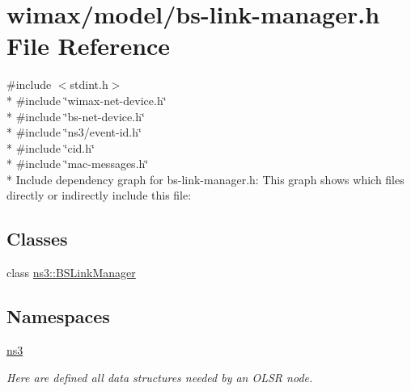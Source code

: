 \hypertarget{bs-link-manager_8h}{}\section{wimax/model/bs-\/link-\/manager.h File Reference}
\label{bs-link-manager_8h}
{\ttfamily \#include $<$stdint.\+h$>$}\\*
{\ttfamily \#include \char`\"{}wimax-\/net-\/device.\+h\char`\"{}}\\*
{\ttfamily \#include \char`\"{}bs-\/net-\/device.\+h\char`\"{}}\\*
{\ttfamily \#include \char`\"{}ns3/event-\/id.\+h\char`\"{}}\\*
{\ttfamily \#include \char`\"{}cid.\+h\char`\"{}}\\*
{\ttfamily \#include \char`\"{}mac-\/messages.\+h\char`\"{}}\\*
Include dependency graph for bs-\/link-\/manager.h\+:
This graph shows which files directly or indirectly include this file\+:
\subsection*{Classes}
\begin{DoxyCompactItemize}
\item 
class \hyperlink{classns3_1_1BSLinkManager}{ns3\+::\+B\+S\+Link\+Manager}
\end{DoxyCompactItemize}
\subsection*{Namespaces}
\begin{DoxyCompactItemize}
\item 
 \hyperlink{namespacens3}{ns3}
\begin{DoxyCompactList}\small\item\em Here are defined all data structures needed by an O\+L\+SR node. \end{DoxyCompactList}\end{DoxyCompactItemize}
